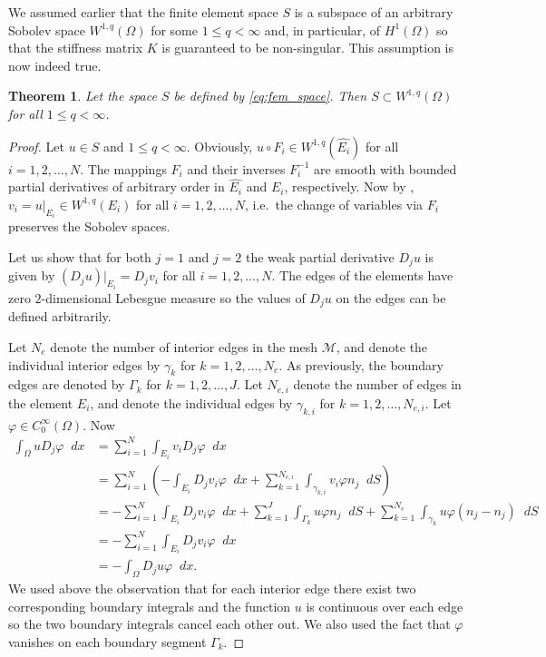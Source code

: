 \documentclass[english, 12pt, a4paper, sci, utf8, a-2b, online]{aaltothesis}
\theoremstyle{definition}
\theoremstyle{plain}
\newtheorem{theorem}{Theorem}[section]
\newcommand*\diff{\mathop{}\!d}
\numberwithin{equation}{section}
\begin{document}
We assumed earlier that the finite element space $S$ is a subspace of
an arbitrary Sobolev space $W^{1,q}(\Omega)$ for some $1 \leq q < \infty$ and,
in particular, of $H^1(\Omega)$ so that the stiffness matrix $K$
is guaranteed to be non-singular.
This assumption is now indeed true.
\begin{theorem}
    \label{thm:fem_space_is_sobolev}
    Let the space $S$ be defined by \eqref{eq:fem_space}.
    Then $S \subset W^{1,q}(\Omega)$ for all $1 \leq q < \infty$.
\end{theorem}
\begin{proof}
    Let $u \in S$ and $1 \leq q < \infty$.
    Obviously, $u \circ F_i \in W^{1,q}(\widehat{E_i})$ for all $i=1,2,\dotsc,N$.
    The mappings $F_i$ and their inverses $F_i^{-1}$ are smooth with bounded
    partial derivatives of arbitrary order in $\widehat{E_i}$ and $E_i$,
    respectively. Now by \cite[Theorem 1 on p.\ 13]{mazya2011},
    $v_i = u|_{E_i} \in W^{1,q}(E_i)$ for all $i=1,2,\dotsc,N$,
    i.e.\ the change of variables via $F_i$ preserves the Sobolev spaces.
    
    Let us show that for both $j=1$ and $j=2$ the weak partial derivative
    $D_j u$ is given by $(D_j u)|_{E_i} = D_j v_i$ for all $i=1,2,\dotsc,N$.
    The edges of the elements have zero $2$-dimensional Lebesgue measure
    so the values of $D_j u$ on the edges can be defined arbitrarily.

    Let $N_e$ denote the number of interior edges in the mesh $\mathcal{M}$,
    and denote the individual interior edges by $\gamma_k$ for
    $k = 1,2,\dotsc,N_e$. As previously, the boundary edges are
    denoted by $\Gamma_k$ for $k = 1,2,\dotsc,J$.
    Let $N_{e,i}$ denote the number of edges in the element $E_i$,
    and denote the individual edges by
    $\gamma_{k,i}$ for $k=1,2,\dotsc,N_{e,i}$.
    Let $\varphi \in C_0^{\infty}(\Omega)$. Now
    \begin{align*}
        \int_{\Omega} u D_j \varphi \diff x
        &= \sum_{i=1}^{N} \int_{E_i} v_i D_j \varphi \diff x \\
        &= \sum_{i=1}^{N} \left(
                - \int_{E_i} D_j v_i \varphi \diff x    
                + \sum_{k=1}^{N_{e,i}}
                    \int_{\gamma_{k,i}} v_i \varphi n_j \diff S
            \right) \\
        &= - \sum_{i=1}^{N} \int_{E_i} D_j v_i \varphi \diff x
            + \sum_{k=1}^{J} \int_{\Gamma_k} u \varphi n_j \diff S
            + \sum_{k=1}^{N_e} \int_{\gamma_k} u \varphi (n_j - n_j) \diff S \\
        &= - \sum_{i=1}^{N} \int_{E_i} D_j v_i \varphi \diff x \\
        &= - \int_{\Omega} D_j u \varphi \diff x.
    \end{align*}
    We used above the observation that for each interior edge there exist two
    corresponding boundary integrals and the function $u$ is continuous
    over each edge so the two boundary integrals cancel each other out.
    We also used the fact that $\varphi$ vanishes on each boundary segment
    $\Gamma_k$.


\end{proof}
\end{document}
